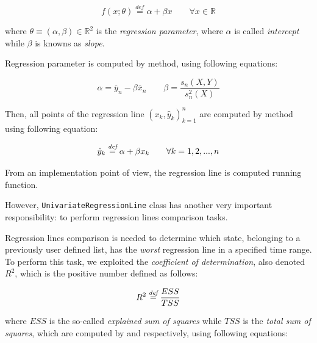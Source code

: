 \documentclass[sigconf]{acmart}
\begin{document}
\begin{equation}
f(x; \theta) \overset{\mathrm{\textit{def}}}{=} \alpha + \beta x \qquad \forall x \in \mathbb{R}
\end{equation}

where $\theta \equiv (\alpha , \beta) \in \mathbb{R}^2$ is the \textit{regression parameter}, where $\alpha$ is called \textit{intercept} while $\beta$ is knowns as \textit{slope}.

Regression parameter is computed by  method, using following equations:

\begin{equation}
\alpha = \overline{y}_n - \beta \overline{x}_n \qquad \beta = \dfrac{s_n(X,Y)}{s^2_n(X)}
\end{equation}

Then, all points of the regression line $(x_k,\hat{y}_k)_{k=1}^n$ are computed by  method using following equation:

\begin{equation}
\hat{y}_k \overset{\textit{def}}{=} \alpha + \beta x_k \qquad \forall k = 1,2,...,n
\end{equation}

From an implementation point of view, the regression line is computed running  function.
 
However, \texttt{UnivariateRegressionLine} class has another very important responsibility: to perform regression lines comparison tasks.

Regression lines comparison is needed to determine which state, belonging to a previously user defined list, has the \textit{worst} regression line in a specified time range. 
To perform this task, we exploited the \textit{coefficient of determination}, also denoted $R^2$, which is the positive number defined as follows:

\begin{equation}
R^2 \overset{\textit{def}}{=} \dfrac{ESS}{TSS}
\end{equation}

where $ESS$ is the so-called \textit{explained sum of squares} while $TSS$ is the \textit{total sum of squares}, which are computed by  and  respectively, using following equations:
\end{document}
